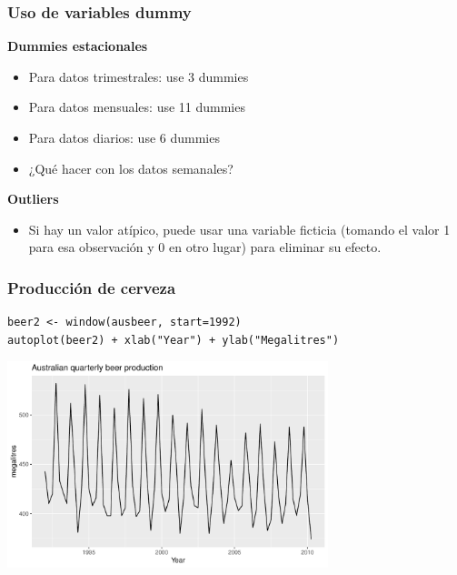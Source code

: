\documentclass[10pt]{beamer}
\begin{document}




\begin{frame}[fragile]
\frametitle{Uso de variables dummy}


\textbf{Dummies estacionales}

\begin{itemize}
\item Para datos trimestrales: use 3 dummies
\item Para datos mensuales: use 11 dummies
\item Para datos diarios: use 6 dummies
\item ¿Qué hacer con los datos semanales?

\end{itemize}

\vspace{4mm}

\textbf{Outliers}

\begin{itemize}
\item Si hay un valor atípico, puede usar una variable ficticia (tomando el valor 1 para esa observación y 0 en otro lugar) para eliminar su efecto.
\end{itemize}


\end{frame}







\begin{frame}[fragile]
\frametitle{Producción de cerveza}


\lstset{language=r,label= ,caption= ,captionpos=b,numbers=none}
\begin{lstlisting}
beer2 <- window(ausbeer, start=1992)
autoplot(beer2) + xlab("Year") + ylab("Megalitres")
\end{lstlisting}

\pause

\begin{center}
\includegraphics[width=0.7\textwidth]{5-regression_files/figure-beamer/unnamed-chunk-4-1.pdf}
\end{center}


\end{frame}
\end{document}

